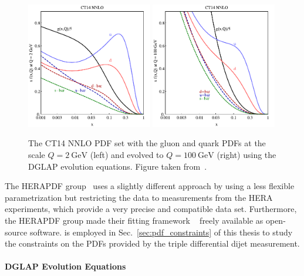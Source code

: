 \begin{figure}[tbp] 
    \centering
    \includegraphics[width=0.49\textwidth]{figures/theoretical_foundations/ct14_2.pdf}\hfill
    \includegraphics[width=0.49\textwidth]{figures/theoretical_foundations/ct14_100.pdf}
    \caption[CT14 NNLO PDF set]{The CT14 NNLO PDF set with the gluon and quark
        PDFs at the scale $Q=\SI{2}{\GeV}$ (left) and evolved to $Q=\SI{100}{\GeV}$
    (right) using the DGLAP evolution equations. Figure taken
    from~\cite{Dulat:2015mca}.}
    \label{fig:ct14_parton_distributions} 
\end{figure}

The HERAPDF group~\cite{Abramowicz:2015mha} uses a slightly different approach
by using a less flexible parametrization but restricting the data to
measurements from the HERA experiments, which provide a very precise and
compatible data set. Furthermore, the HERAPDF group made their fitting framework
\xfitter~\cite{Alekhin:2014irh} freely available as open-source software.
\xfitter is employed in Sec.~\ref{sec:pdf_constraints} of this thesis to study
the constraints on the PDFs provided by the triple differential dijet
measurement.

\paragraph{DGLAP Evolution Equations}

